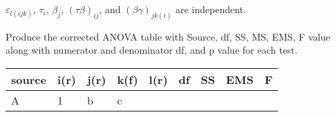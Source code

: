 \documentclass[12pt,]{article}
\begin{document}
\(\varepsilon_{l(ijk)}\), \(\tau_{i}\), \(\beta_{j}\),
\((\tau\beta)_{ij}\), and \((\beta\gamma)_{jk(i)}\) are independent.

\textcolor[rgb]{0.7,0.7,0.7}{Produce the corrected ANOVA table with Source, df, SS, MS, EMS, F value along with numerator and denominator df, and p value for each test.}

\begin{longtable}[]{@{}lllllllll@{}}
\toprule
\begin{minipage}[b]{0.06\columnwidth}\raggedright
source\strut
\end{minipage} & \begin{minipage}[b]{0.03\columnwidth}\raggedright
i(r)\strut
\end{minipage} & \begin{minipage}[b]{0.03\columnwidth}\raggedright
j(r)\strut
\end{minipage} & \begin{minipage}[b]{0.03\columnwidth}\raggedright
k(f)\strut
\end{minipage} & \begin{minipage}[b]{0.03\columnwidth}\raggedright
l(r)\strut
\end{minipage} & \begin{minipage}[b]{0.12\columnwidth}\raggedright
df\strut
\end{minipage} & \begin{minipage}[b]{0.15\columnwidth}\raggedright
SS\strut
\end{minipage} & \begin{minipage}[b]{0.21\columnwidth}\raggedright
EMS\strut
\end{minipage} & \begin{minipage}[b]{0.09\columnwidth}\raggedright
F\strut
\end{minipage}\tabularnewline
\midrule
\endhead
\begin{minipage}[t]{0.06\columnwidth}\raggedright
A\strut
\end{minipage} & \begin{minipage}[t]{0.03\columnwidth}\raggedright
1\strut
\end{minipage} & \begin{minipage}[t]{0.03\columnwidth}\raggedright
b\strut
\end{minipage} & \begin{minipage}[t]{0.03\columnwidth}\raggedright
c\strut
\end{minipage} & \begin{minipage}[t]{0.03\columnwidth}\raggedright

\end{minipage}
\end{longtable}
\end{document}
